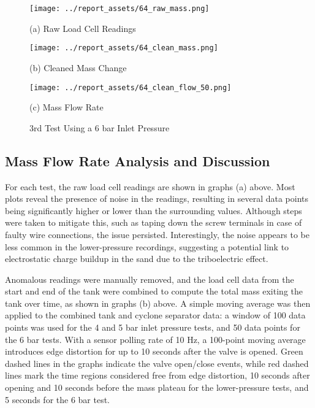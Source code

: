 \vfill
\begin{figure}[htbp]
    \centering

    \begin{minipage}{0.32\textwidth}
        \centering
        \texttt{[image: ../report\_assets/64\_raw\_mass.png]}
        \caption*{(a) Raw Load Cell Readings}
    \end{minipage}
    \hfill
    \begin{minipage}{0.32\textwidth}
        \centering
        \texttt{[image: ../report\_assets/64\_clean\_mass.png]}
        \caption*{(b) Cleaned Mass Change}
    \end{minipage}
    \hfill
    \begin{minipage}{0.32\textwidth}
        \centering
        \texttt{[image: ../report\_assets/64\_clean\_flow\_50.png]}
        \caption*{(c) Mass Flow Rate}
    \end{minipage}
    \caption{3rd Test Using a 6 bar Inlet Pressure}
    
\end{figure}\label{fig:64}
\vfill
\newpage

\subsection{Mass Flow Rate Analysis and Discussion}
For each test, the raw load cell readings are shown in graphs (a) above. Most plots reveal the presence of noise in the readings, resulting in several data points being significantly higher or lower than the surrounding values. Although steps were taken to mitigate this, such as taping down the screw terminals in case of faulty wire connections, the issue persisted. Interestingly, the noise appears to be less common in the lower-pressure recordings, suggesting a potential link to electrostatic charge buildup in the sand due to the triboelectric effect.

Anomalous readings were manually removed, and the load cell data from the start and end of the tank were combined to compute the total mass exiting the tank over time, as shown in graphs (b) above. A simple moving average was then applied to the combined tank and cyclone separator data: a window of 100 data points was used for the 4 and 5 bar inlet pressure tests, and 50 data points for the 6 bar tests. With a sensor polling rate of 10 Hz, a 100-point moving average introduces edge distortion for up to 10 seconds after the valve is opened. Green dashed lines in the graphs indicate the valve open/close events, while red dashed lines mark the time regions considered free from edge distortion, 10 seconds after opening and 10 seconds before the mass plateau for the lower-pressure tests, and 5 seconds for the 6 bar test.

